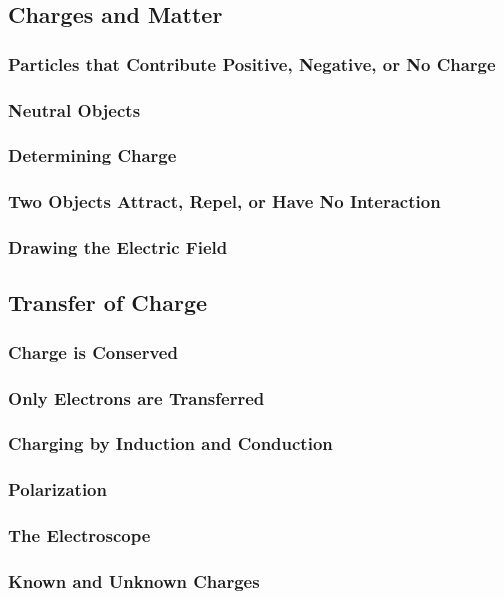 \documentclass[../main-physics-problems.tex]{subfiles}
\begin{document}
\subsection{Charges and Matter}
\subsubsection{Particles that Contribute Positive, Negative, or No Charge}
\subsubsection{Neutral Objects}
\subsubsection{Determining Charge}
\subsubsection{Two Objects Attract, Repel, or Have No Interaction}
\subsubsection{Drawing the Electric Field}

\clearpage

\subsection{Transfer of Charge}
\subsubsection{Charge is Conserved}
\subsubsection{Only Electrons are Transferred}
\subsubsection{Charging by Induction and Conduction}
\subsubsection{Polarization}
\subsubsection{The Electroscope}
\subsubsection{Known and Unknown Charges}
\end{document}
